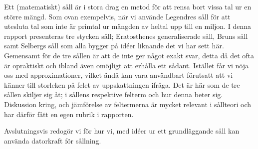 Ett (matematiskt) såll är i stora drag en metod för att rensa bort vissa tal ur en större mängd.
Som ovan exempelvis, när vi använde Legendres såll för att utesluta tal som inte är primtal ur mängden av heltal upp till en miljon.
I denna rapport presenteras tre stycken såll;
Eratosthenes generaliserade såll, Bruns såll samt Selbergs såll som alla bygger på idéer liknande det vi har sett här.
Gemensamt för de tre sållen är att de inte ger något exakt svar, detta då det ofta är opraktiskt och ibland även omöjligt att erhålla ett sådant.
Istället får vi nöja oss med approximationer, vilket ändå kan vara användbart förutsatt att vi känner till storleken på felet av uppskattningen ifråga.
Det är här som de tre sållen skiljer sig åt; i sållens respektive felterm och hur denna beter sig.
Diskussion kring, och jämförelse av feltermerna är mycket relevant i sållteori och har därför fått en egen rubrik i rapporten.


Avslutningsvis redogör vi för hur vi, med idéer ur ett grundläggande såll kan använda datorkraft för sållning.












